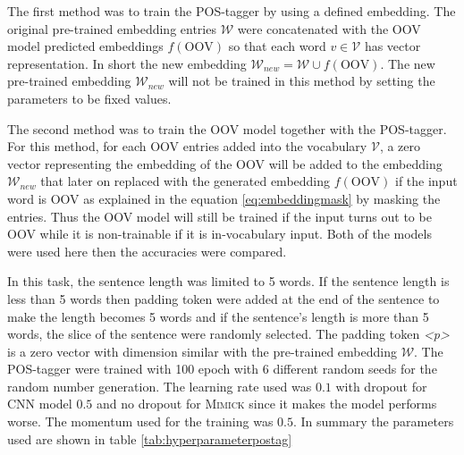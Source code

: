         The first method was to train the POS-tagger by using a
        defined embedding. The original pre-trained embedding entries
        $\mathcal{W}$ were concatenated with the OOV model predicted
        embeddings $f(\text{OOV})$ so that each word $v \in
        \mathcal{V}$ has vector representation. In short the new
        embedding $\mathcal{W}_{new} = \mathcal{W} \cup
        f(\text{OOV})$. The new pre-trained embedding
        $\mathcal{W}_{new}$ will not be trained in this method by
        setting the parameters to be fixed values.
        
        The second method was to train the OOV model together with the
        POS-tagger. For this method, for each OOV entries added into
        the vocabulary $\mathcal{V}$, a zero vector representing the
        embedding of the OOV will be added to the embedding
        $\mathcal{W}_{new}$ that later on replaced with the
        generated embedding $f(\text{OOV})$ if the input word is OOV
        as explained in the equation \ref{eq:embeddingmask} by masking
        the entries. Thus the OOV model will still be trained if the
        input turns out to be OOV while it is non-trainable if it is
        in-vocabulary input. Both of the models were used here then
        the accuracies were compared.

        In this task, the sentence length was limited to 5 words. If
        the sentence length is less than 5 words then padding token
        were added at the end of the sentence to make the length
        becomes 5 words and if the sentence's length is more than 5
        words, the slice of the sentence were randomly selected. The
        padding token \textit{\textless p\textgreater} is a zero
        vector with dimension similar with the pre-trained embedding
        $\mathcal{W}$. The POS-tagger were trained with 100 epoch with
        6 different random seeds for the random number generation. The
        learning rate used was $0.1$ with dropout for CNN model $0.5$
        and no dropout for \textsc{Mimick} since it makes the model
        performs worse. The momentum used for the training was $0.5$.
        In summary the parameters used are shown in table
        \ref{tab:hyperparameterpostag}

